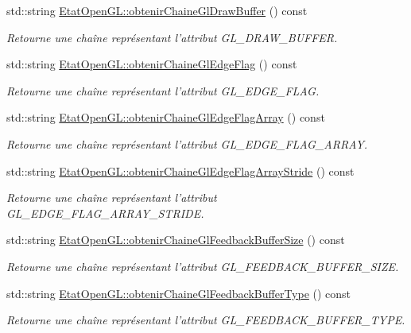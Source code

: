 \begin{DoxyCompactItemize}
std\-::string \hyperlink{group__utilitaire_ga3b705291c7da107645656d5dfb51872a}{Etat\-Open\-G\-L\-::obtenir\-Chaine\-Gl\-Draw\-Buffer} () const 
\begin{DoxyCompactList}\small\item\em Retourne une chaîne représentant l'attribut G\-L\-\_\-\-D\-R\-A\-W\-\_\-\-B\-U\-F\-F\-E\-R. \end{DoxyCompactList}\item 
std\-::string \hyperlink{group__utilitaire_ga982e0dacd18861db40bc153b8e7748d6}{Etat\-Open\-G\-L\-::obtenir\-Chaine\-Gl\-Edge\-Flag} () const 
\begin{DoxyCompactList}\small\item\em Retourne une chaîne représentant l'attribut G\-L\-\_\-\-E\-D\-G\-E\-\_\-\-F\-L\-A\-G. \end{DoxyCompactList}\item 
std\-::string \hyperlink{group__utilitaire_gac69166db434f3671eb241b00786be34b}{Etat\-Open\-G\-L\-::obtenir\-Chaine\-Gl\-Edge\-Flag\-Array} () const 
\begin{DoxyCompactList}\small\item\em Retourne une chaîne représentant l'attribut G\-L\-\_\-\-E\-D\-G\-E\-\_\-\-F\-L\-A\-G\-\_\-\-A\-R\-R\-A\-Y. \end{DoxyCompactList}\item 
std\-::string \hyperlink{group__utilitaire_ga12932637a943b952d6c822af48b4102a}{Etat\-Open\-G\-L\-::obtenir\-Chaine\-Gl\-Edge\-Flag\-Array\-Stride} () const 
\begin{DoxyCompactList}\small\item\em Retourne une chaîne représentant l'attribut G\-L\-\_\-\-E\-D\-G\-E\-\_\-\-F\-L\-A\-G\-\_\-\-A\-R\-R\-A\-Y\-\_\-\-S\-T\-R\-I\-D\-E. \end{DoxyCompactList}\item 
std\-::string \hyperlink{group__utilitaire_gab0ae8d230f1fe733862032e082cfbd2f}{Etat\-Open\-G\-L\-::obtenir\-Chaine\-Gl\-Feedback\-Buffer\-Size} () const 
\begin{DoxyCompactList}\small\item\em Retourne une chaîne représentant l'attribut G\-L\-\_\-\-F\-E\-E\-D\-B\-A\-C\-K\-\_\-\-B\-U\-F\-F\-E\-R\-\_\-\-S\-I\-Z\-E. \end{DoxyCompactList}\item 
std\-::string \hyperlink{group__utilitaire_ga30bdbc77ee2c0b27ee48e5de2654d29c}{Etat\-Open\-G\-L\-::obtenir\-Chaine\-Gl\-Feedback\-Buffer\-Type} () const 
\begin{DoxyCompactList}\small\item\em Retourne une chaîne représentant l'attribut G\-L\-\_\-\-F\-E\-E\-D\-B\-A\-C\-K\-\_\-\-B\-U\-F\-F\-E\-R\-\_\-\-T\-Y\-P\-E. \end{DoxyCompactList}\item 

\end{DoxyCompactItemize}
